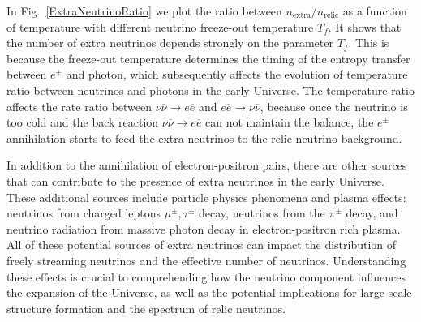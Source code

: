 In Fig.~\ref{ExtraNeutrinoRatio} we plot the ratio between $n_\mathrm{extra}/n_\mathrm{relic}$ as a function of temperature with different neutrino freeze-out temperature $T_f$. It shows that the number of extra neutrinos depends strongly on the parameter $T_f$. This is because the freeze-out temperature determines the timing of the entropy transfer between $e^\pm$ and photon, which subsequently affects the evolution of temperature ratio between neutrinos and photons in the early Universe. The temperature ratio affects the rate ratio between $\nu\overline{\nu}\to e\overline{e}$ and $ e\overline{e}\to\nu\overline{\nu}$, because once the neutrino is too cold and the back reaction $\nu\overline{\nu}\to e\overline{e}$ can not maintain the balance, the $e^\pm$ annihilation starts to feed the extra neutrinos to the relic neutrino background. 

In addition to the annihilation of electron-positron pairs, there are other sources that can contribute to the presence of extra neutrinos in the early Universe. These additional sources include particle physics phenomena and plasma effects: neutrinos from charged leptons $\mu^\pm,\tau^\pm$ decay, neutrinos from the $\pi^\pm$ decay, and neutrino radiation from massive photon decay in electron-positron rich plasma. All of these potential sources of extra neutrinos can impact the distribution of freely streaming neutrinos and the effective number of neutrinos. Understanding these effects is crucial to comprehending how the neutrino component influences the expansion of the Universe, as well as the potential implications for large-scale structure formation and the spectrum of relic neutrinos.
